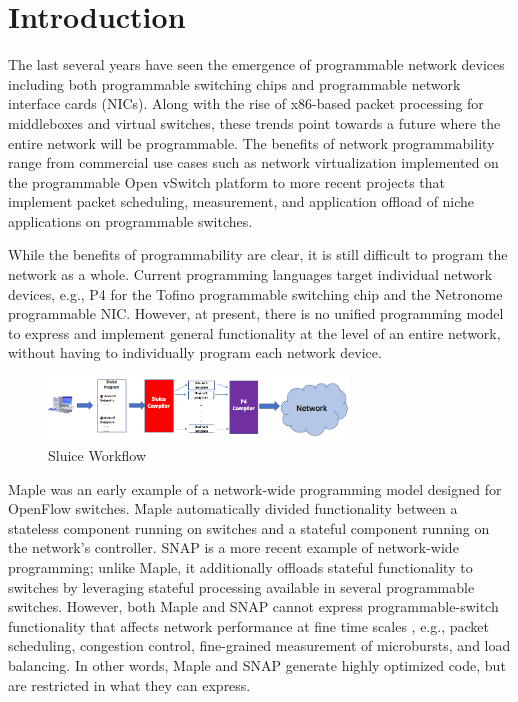 \section{Introduction}
The last several years have seen the emergence of programmable network devices
including both programmable switching chips and programmable network interface
cards (NICs). Along with the rise of x86-based packet processing for
middleboxes and virtual switches, these trends point towards a future where the
entire network will be programmable. The benefits of network programmability
range from commercial use cases such as network virtualization implemented on
the programmable Open vSwitch platform to more recent projects that implement
packet scheduling, measurement, and application offload of niche applications
on programmable switches.

While the benefits of programmability are clear, it is still difficult to
program the network as a whole.  Current programming languages target individual
network devices, e.g., P4 for the Tofino programmable switching chip and the
Netronome programmable NIC. However, at present, there is no unified
programming model to express and implement general functionality at the level
of an entire network, without having to individually program each network
device.

\begin{figure}[tp]
\centering
\includegraphics[width=80mm,scale=0.7]{figures/sluice_workflow.png}
\caption{Sluice Workflow}
\end{figure}


Maple was an early example of a network-wide programming model designed
for OpenFlow switches. Maple automatically divided functionality between a
stateless component running on switches and a stateful component running on the
network's controller. SNAP is a more recent example of network-wide
programming; unlike Maple, it additionally offloads stateful functionality to
switches by leveraging stateful processing available in several  programmable switches. However, both Maple
and SNAP cannot express programmable-switch functionality that affects network
performance at fine time scales , e.g.,
packet scheduling, congestion control, fine-grained measurement of microbursts,
and load balancing. In other words, Maple and SNAP generate highly optimized
code, but are restricted in what they can express.

